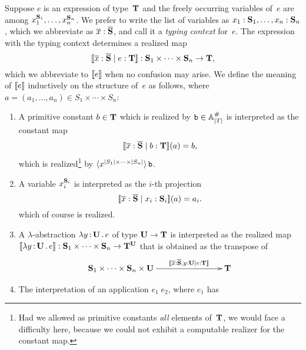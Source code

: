 Suppose $e$ is an expression of type~$\mathbf{T}$ and the freely
occurring variables of~$e$ are among $x_1^{\mathbf{S}_1}, \ldots,
x_n^{\mathbf{S}_n}$. We prefer to write the list of variables as
$x_1 : \mathbf{S}_1, \ldots, x_n : \mathbf{S}_n$, which we abbreviate as
$\overline{x} : \overline{\mathbf{S}}$, and call it a \emph{typing
  context} for~$e$. The expression with the typing context determines
a realized map
%
\begin{equation*}
  [\![\overline{x} : \overline{\mathbf{S}} \mid e : \mathbf{T}]\!] :
  \mathbf{S}_1 \times \cdots \times \mathbf{S}_n \to \mathbf{T},
\end{equation*}
%
which we abbreviate to $[\![e]\!]$ when no confusion may arise. We
define the meaning of $[\![e]\!]$ inductively on the structure of~$e$ as
follows, where $a = (a_1, \ldots, a_n) \in S_1 \times \cdots \times
S_n$:
%
\begin{enumerate}
\item A primitive constant $b \in \mathbf{T}$ which is realized by $\mathtt{b}
  \in \mathbb{A}^{\#}_{|T|}$ is interpreted as the constant map
  \begin{equation*}
    [\![\overline{x} : \overline{\mathbf{S}} \mid b : \mathbf{T}]\!](a) = b,
  \end{equation*}
  which is realized\footnote{Had we allowed as primitive constants
    \emph{all} elements of~$\mathbf{T}$, we would face a difficulty here,
    because we could not exhibit a computable realizer for the
    constant map.} by $\langle x^{|S_1| \times \cdots \times
      |S_n|} \rangle\,\mathtt{b}$.
\item A variable $x_i^{\mathbf{S}_i}$ is interpreted as the $i$-th
  projection
  \begin{equation*}
    [\![\overline{x} : \overline{\mathbf{S}} \mid x_i : \mathbf{S}_i]\!](a) = a_i.
  \end{equation*}
  which of course is realized.
\item A $\lambda$-abstraction $\lambda y \,{:}\, \mathbf{U}\,.\,e$ of type $\mathbf{U}
  \to \mathbf{T}$ is interpreted as the realized map
  $[\![\lambda y \,{:}\, \mathbf{U}\,.\,e]\!] : \mathbf{S}_1 \times \cdots \times
  \mathbf{S}_n \to \mathbf{T}^{\mathbf{U}}$ that is obtained as the transpose
  of
  \begin{equation*}
    \xymatrix@+2em{
      **[l]{\asm{S}_1 \times \cdots \times \asm{S}_n \times \asm{U}}
      \ar[r]^{\sem{\overline{x}:\overline{\asm{S}}, y : \asm{U} \ctx e
        : \asm{T}}}
      &
      {\asm{T}}
    }
  \end{equation*}
\item The interpretation of an application $e_1\;e_2$, where $e_1$ has

\end{enumerate}
